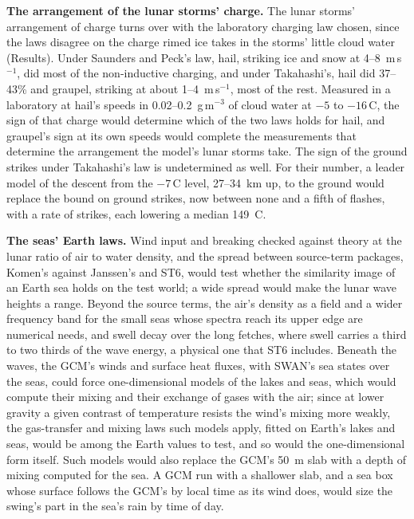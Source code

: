 \textbf{The arrangement of the lunar storms' charge.} The lunar storms' arrangement of charge turns over with the
laboratory charging law chosen, since the laws disagree on the charge rimed ice takes in the storms' little cloud
water (Results). Under Saunders and Peck's law, hail, striking ice and snow at 4--8~m\,s$^{-1}$, did most of the non-inductive charging, and under Takahashi's, hail did 37--43\% and graupel, striking at about 1--4~m\,s$^{-1}$, most of
the rest. Measured in a laboratory at hail's
speeds in 0.02--0.2~g\,m$^{-3}$ of cloud water at $-5$ to $-16$\,\textdegree C, the sign of that charge would determine which of the two laws holds for hail, and graupel's sign at its own speeds would complete the measurements that determine the arrangement the model's lunar storms take. The sign of the ground strikes under Takahashi's law is undetermined as well. For their number, a leader model of the descent from the $-7$\,\textdegree C level, 27--34~km
up, to the ground would replace the bound on ground strikes, now between none and a fifth of flashes, with a rate of
strikes, each lowering a median 149~C.

\textbf{The seas' Earth laws.} Wind input and breaking checked against theory at the lunar ratio of air to water
density, and the spread between source-term packages, Komen's against Janssen's and ST6, would test whether the similarity image of an Earth sea holds on the test world; a wide spread would make the lunar wave heights a
range. Beyond the source terms, the air's density as a field and a wider frequency band for the small seas whose
spectra reach its upper edge are numerical needs, and swell decay over the long fetches, where swell carries a third
to two thirds of the wave energy, a physical one that ST6 includes. Beneath the waves, the GCM's winds and
surface heat fluxes, with SWAN's sea states over the seas, could force one-dimensional models of the lakes and seas,
which would compute their mixing and their exchange of gases with the air; since at lower gravity a given contrast
of temperature resists the wind's mixing more weakly, the gas-transfer and mixing laws such models apply, fitted on
Earth's lakes and seas, would be among the Earth values to test, and so would the one-dimensional form itself. Such
models would also replace the GCM's 50~m slab with a depth of mixing computed for the sea. A GCM run with a shallower slab, and a sea box
whose surface follows the GCM's by local time as its wind does, would size the swing's part in the sea's rain by
time of day.
